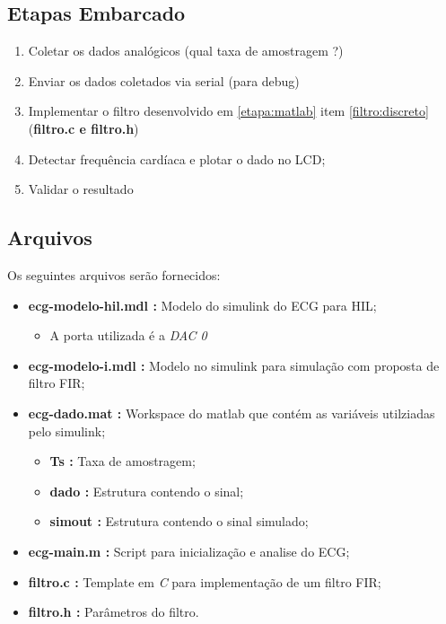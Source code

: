\documentclass[11pt,a4paper]{scrartcl}
\begin{document}
\subsection{Etapas Embarcado}

\begin{enumerate}
	\item Coletar os dados analógicos (qual taxa de amostragem ?)
	\item Enviar os dados coletados via serial (para debug)
	\item Implementar o filtro desenvolvido em \ref{etapa:matlab} item \ref{filtro:discreto} (\textbf{filtro.c e filtro.h})
	\item Detectar frequência cardíaca e plotar o dado no LCD;
	\item Validar o resultado
\end{enumerate}

\subsection{Arquivos}

Os seguintes arquivos serão fornecidos:

\begin{itemize}
	\item \textbf{ecg-modelo-hil.mdl :} Modelo do simulink do ECG para HIL;
	
	\begin{itemize}
		\item  A porta utilizada é a \textit{DAC 0}
	\end{itemize}
	
 \item \textbf{ecg-modelo-i.mdl :} Modelo no simulink para simulação com proposta de filtro FIR;
	 
	\item \textbf{ecg-dado.mat :} Workspace do matlab que contém as variáveis utilziadas pelo simulink;
	
	\begin{itemize}
		\item \textbf{Ts :} Taxa de amostragem;
		\item \textbf{dado :} Estrutura contendo o sinal;
		\item \textbf{simout :} Estrutura  contendo o sinal simulado;
	\end{itemize}
	
	\item \textbf{ecg-main.m :} Script para inicialização e analise do ECG; 
	
	\item \textbf{filtro.c :} Template em \textit{C} para implementação de um filtro FIR;
	\item\textbf{filtro.h :} Parâmetros do filtro.
	
\end{itemize}
\end{document}
